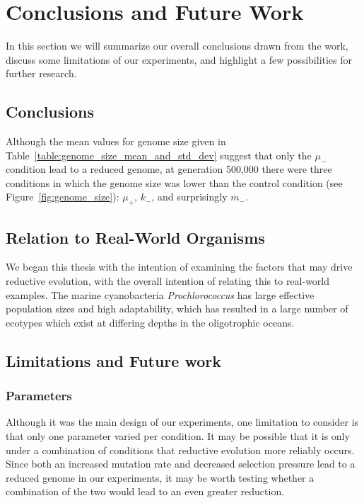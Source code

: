 
\chapter{Conclusions and Future Work}\label{ch:conclusion}
In this section we will summarize our overall conclusions drawn from the work, discuss some limitations of our experiments, and highlight a few possibilities for further research.

\section{Conclusions}
Although the mean values for genome size given in Table~\ref{table:genome_size_mean_and_std_dev} suggest that only the $\mu_-$ condition lead to a reduced genome, at generation 500,000 there were three conditions in which the genome size was lower than the control condition (see Figure~\ref{fig:genome_size}): $\mu_+$, $k_-$, and surprisingly $m_-$. 

\section{Relation to Real-World Organisms}
We began this thesis with the intention of examining the factors that may drive reductive evolution, with the overall intention of relating this to real-world examples. The marine cyanobacteria \textit{Prochlorococcus} has large effective population sizes and high adaptability, which has resulted in a large number of ecotypes which exist at differing depths in the oligotrophic oceans. 
  
\section{Limitations and Future work}\label{limitations}
\subsection{Parameters}
Although it was the main design of our experiments, one limitation to consider is that only one parameter varied per condition. It may be possible that it is only under a combination of conditions that reductive evolution more reliably occurs. Since both an increased mutation rate and decreased selection pressure lead to a reduced genome in our experiments, it may be worth testing whether a combination of the two would lead to an even greater reduction. 

